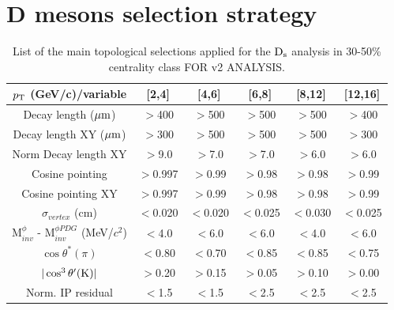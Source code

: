 \section{D mesons selection strategy}

\begin{table}[!h]
 \caption{List of the main topological selections applied for the
   ${\rm D_s}$ analysis in 30-50\% centrality class FOR v2 ANALYSIS.}
 \label{Ds_cuts}
 \begin{center}
  \begin{tabular}{|c|c|c|c|c|c|}
\hline
$p_{\rm T}$ (GeV/c)/variable & [2,4] & [4,6] & [6,8] & [8,12] & [12,16] \\
\hline
\hline
Decay length ($\mathrm{\mu m}$)        & $>$400 & $>$500 & $>$500 & $>$500 & $>$400\\
\hline
Decay length XY ($\mathrm{\mu m}$)     & $>$300 & $>$500 & $>$500 & $>$500 & $>$300\\
\hline
Norm Decay length XY          & $>$9.0& $>$7.0 & $>$7.0 & $>$6.0 & $>$6.0\\
\hline
Cosine pointing              & $>$0.997 & $>$0.99 & $>$0.98 & $>$0.98 & $>$0.99\\
\hline
Cosine pointing XY        & $>$0.997 & $>$0.99 & $>$0.98 & $>$0.98 & $>$0.99\\
\hline
$\sigma_{vertex}$  (cm)          & $<$0.020 & $<$0.020 & $<$0.025 & $<$0.030 & $<$0.025\\
\hline
M$^{\phi}_{inv}$ - M$^{\phi PDG}_{inv}$ (MeV/$c^{2}$) & $<$4.0 & $<$6.0 & $<$6.0 & $<$4.0 & $<$6.0\\
\hline
$\cos \theta^*(\pi)$    & $<$0.80 & $<$0.70 & $<$0.85 & $<$0.85 & $<$0.75\\
\hline
$|\cos^3 \theta^\prime({\rm K})|$        & $>$0.20 & $>$0.15 & $>$0.05 & $>$0.10 & $>$0.00\\
\hline
Norm. IP residual   & $<$1.5 & $<$1.5 & $<$2.5 & $<$2.5 & $<$2.5 \\
\hline
  \end{tabular}
 \end{center}
\end{table} 

